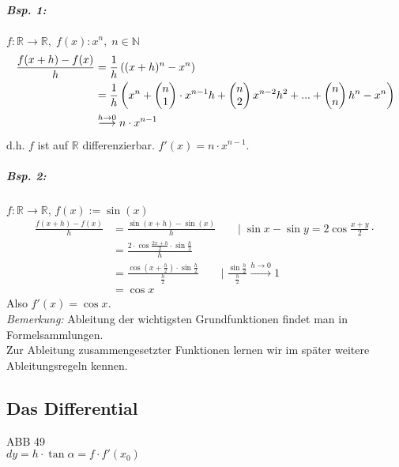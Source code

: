 \subparagraph{Bsp. 1:} $f: \mathbb{R}\to \mathbb{R}, \; f(x): x^n, \; n \in \mathbb{N}$
\begin{align*}
\frac{f(x+h)-f(x)}{h}&=\frac{1}{h}\left((x+h)^n-x^n\right)\\
&=\frac{1}{h}\left(x^n+\begin{pmatrix}n\\1\end{pmatrix}\cdot x^{n-1}h+\begin{pmatrix}n\\2\end{pmatrix}x^{n-2}h^2+...+\begin{pmatrix}n\\n\end{pmatrix}h^n-x^n\right)\\
&\overset{h\to 0}{\longrightarrow}n\cdot x^{n-1}
\end{align*}
d.h. $f$ ist auf $\mathbb{R}$ differenzierbar. $f'(x)=n\cdot x^{n-1}$.

\subparagraph{Bsp. 2:} $f: \mathbb{R} \to \mathbb{R}$, $f(x):= \sin(x)$
\begin{align*}
\frac{f(x+h)-f(x)}{h}&=\frac{\sin(x+h)-\sin(x)}{h} \qquad |\; \sin x-\sin y=2\cos\frac{x+y}{2}\cdot\\
&= \frac{2\cdot \cos \frac{2x+h}{2}\cdot \sin \frac{h}{2}}{h}\\
&= \frac{\cos \left( x+\frac{h}{2}\right) \cdot \sin \frac{h}{2}}{\frac{h}{2}} \qquad |\; \frac{\sin \frac{h}{2}}{\frac{h}{2}} \overset{h\to 0}{\longrightarrow}1\\
&= \cos x
\end{align*}
Also $f'(x)=\cos x$.\\
\emph{Bemerkung:} Ableitung der wichtigsten Grundfunktionen findet man in Formelsammlungen.\\
Zur Ableitung zusammengesetzter Funktionen lernen wir im später weitere Ableitungsregeln kennen.

\subsection{Das Differential} \parskp
ABB 49\\
$dy=h\cdot \tan \alpha = f \cdot f'(x_0)$
